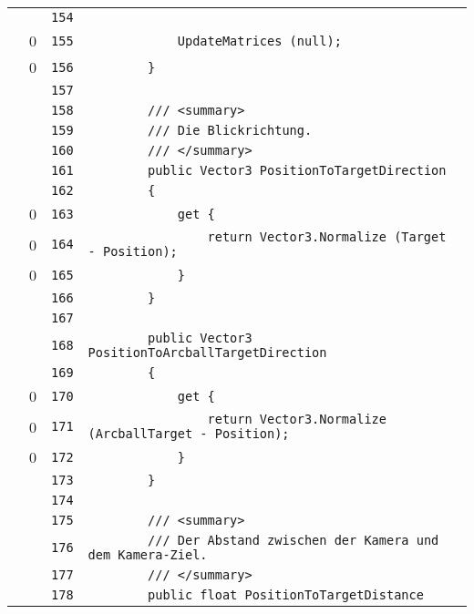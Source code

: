 \documentclass[a4paper,10pt]{article}
\begin{document}
\begin{longtable}[l]{lrrl}
\cellcolor{gray} &  & \verb~154~ & \verb~~\\
\cellcolor{red} & 0 & \verb~155~ & \verb~            UpdateMatrices (null);~\\
\cellcolor{red} & 0 & \verb~156~ & \verb~        }~\\
\cellcolor{gray} &  & \verb~157~ & \verb~~\\
\cellcolor{gray} &  & \verb~158~ & \verb~        /// <summary>~\\
\cellcolor{gray} &  & \verb~159~ & \verb~        /// Die Blickrichtung.~\\
\cellcolor{gray} &  & \verb~160~ & \verb~        /// </summary>~\\
\cellcolor{gray} &  & \verb~161~ & \verb~        public Vector3 PositionToTargetDirection~\\
\cellcolor{gray} &  & \verb~162~ & \verb~        {~\\
\cellcolor{red} & 0 & \verb~163~ & \verb~            get {~\\
\cellcolor{red} & 0 & \verb~164~ & \verb~                return Vector3.Normalize (Target - Position);~\\
\cellcolor{red} & 0 & \verb~165~ & \verb~            }~\\
\cellcolor{gray} &  & \verb~166~ & \verb~        }~\\
\cellcolor{gray} &  & \verb~167~ & \verb~~\\
\cellcolor{gray} &  & \verb~168~ & \verb~        public Vector3 PositionToArcballTargetDirection~\\
\cellcolor{gray} &  & \verb~169~ & \verb~        {~\\
\cellcolor{red} & 0 & \verb~170~ & \verb~            get {~\\
\cellcolor{red} & 0 & \verb~171~ & \verb~                return Vector3.Normalize (ArcballTarget - Position);~\\
\cellcolor{red} & 0 & \verb~172~ & \verb~            }~\\
\cellcolor{gray} &  & \verb~173~ & \verb~        }~\\
\cellcolor{gray} &  & \verb~174~ & \verb~~\\
\cellcolor{gray} &  & \verb~175~ & \verb~        /// <summary>~\\
\cellcolor{gray} &  & \verb~176~ & \verb~        /// Der Abstand zwischen der Kamera und dem Kamera-Ziel.~\\
\cellcolor{gray} &  & \verb~177~ & \verb~        /// </summary>~\\
\cellcolor{gray} &  & \verb~178~ & \verb~        public float PositionToTargetDistance~\\

\end{longtable}
\end{document}
